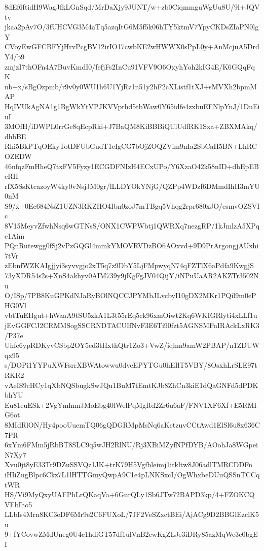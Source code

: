 8dEf6ftidH9WagJfkLGnSqd/MrDaXjy9JUNT/w+zb0CiqmmguWgUu8U/9l+JQVtv
jkaa2pAv7O/3fUHCVG3M4aTq5azqItG6M5f5k06hTY5ktmV7YpyCKDsZIaPN0lgY
CVoyEwGFCBFYjHrvPcgBV12irIO17cwbKE2wHWWX0sPpL0y+AnMcjuA5DrdY4/b9
zmjzI7thOFn4A7BuvKmdI0/fefjFs2InCu91VFV9O6OxyhYoh2kIG4E/K6GQqFqK
nb+x/sBgOzpmb/r9v0y0WU1h6U1YjRz1n51y2hF2cXListf1tXJ+sMVXh2bpmMAP
HqIVUkAgNA1g1BgWkYtVPJKVVprhd5tbWaw0Y65idfe4zxbuEFNlpYnJ/1DuEiuI
3MOfH/iDWPL0rrGe8qEcpRki+J7BaQM8KiBBBiQUlUdfRK1Sxa+ZBXMAkq/dhbBE
Rhi5BkPTqOEkyTotDFUbGudT1cIgCG7bOjZOQZVim9nIa2SbCaH5BN+LhRCOZEDW
46nfqzFmHheQ7txFV5Fyzy1ECGDFNIzH4ECxUPo/Y6XzaO42k58nID+dhEpEBeRH
rfX5SsKtcazoyW4ky0vNsjJM0gr/lLLDYOkYNjG/QZPp4WDzf6DMmdIhH3mYU0nM
S9/x+0Ec684NsZ1UZN3RKZHO4Ibn0zoJ7mTBgq5Vhqg2rpr680xJO/esmvOZSVIc
8V15MeyvZfwhNsq6wGTNsS/ONX1CWPWbtj1QWRXq7nezgRP/1kJmlzA5XPqe1Aim
PQnRutewgg0fSj2vPzGQGl4mmkYMOVRVDzBO6AOxvd+9D9PrArgongjAUxhi7tVr
zEbnfWZKAIgjjyi3syvvgjo2xT5q7z9DbY5LjFMpwyqN74qFZTlX6aPdfa9KwgjS
73yXDR54s2s+XnS4akhyv0AIM739y9jKgFgJV04QijY/iNPuUaAR2AKZTr3502Nu
O/ISp/7PB8KuGPKdNJaRyBOlNQCCJPYMbJLvcbyI10gDX2MKr1PQil9m0ePHG0Vl
vbtTuEHgut+hWaaA9tSU5zkA1L3t55rEq5ck96xmOiwt2Kq6WKIGRlyti4xLLf1u
jEvGGFCJ2CRMMSogSSCRNDTACUIfNvF3E6Ti90fzt5AGNSMFnIRAckLxRK3/P37e
Uhfe6ypRDKyvCSbp2OY5ed3tHxthQtr1Zo3+VwZ/iqhm9amW2PBAP/n1ZDUWqx95
s/DOPi1YYPuXWFsrrXBWAtowwu0dveEPYTGu0hEIlT5VBY/8OsxhLrSLE97tRKR2
vAeIS9cHCy1qXbNQSbugkSwJQu1BuM7tEmtKJb8ZhCn3kiE1dQaGNFd5dPDKbhYU
Eu81euESk+2VgYmhnnJMoEbg40lWelPqMgRd2Zr6u6aF/FNV1XF6Xf+E5RMIG6ot
8MIdRlON/Hy4pooUuemTQ06gQDGRMpMsNq6aKctzuvCCtAwd1ElSl6u8x636C7PR
6xYm6FMm5jRbBT8SLC9q5wJH2RlNU/Rj3XBiMZyfNPfDYB/AOohJa8WGpeiN7Xy7
Xvu0jt8yE33Tr9DZuSSVQz1JK+trK79H5Vgfbleimj1itkltw8J06adlTMRCDDFn
iHIiZugBlpc6Ckz7L1lHTTGmyQwpA9C1e4pLNKSxcI/OgWhxbeDUuQSSnTCCqtWR
HS/Vi9MyQxyUAFPhLrQKaqVa+6GurQLy1Sb6JTw72BAPD3kp/4+FZOKCQVFbIho5
LLbIs4Mrn8KC3eDF6Mr9e2C6FUXoL/7JF2VeSZxctBEi/AjACg9D2BBGlEzclK5u
9+fYCovwZMdUneg0U4c1hdiGT57df1ulVnB2ewKgZLJe3iDRy85azMqWe3c0bgEI
